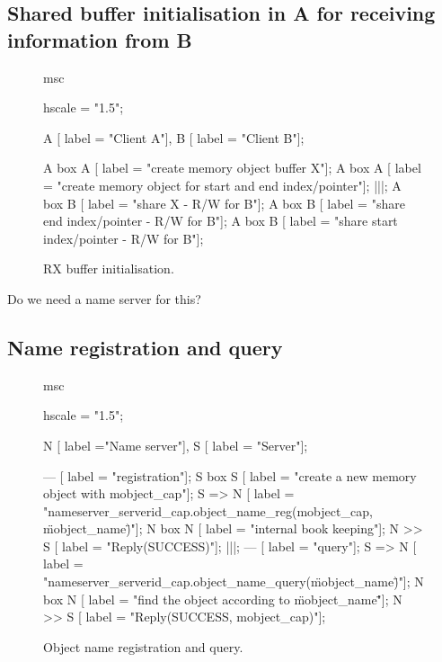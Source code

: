 \subsection{Shared buffer initialisation in A for receiving information from B}

\begin{figure}[htb]
\begin{center}
\begin{msc}
msc {
    hscale = "1.5";

    A [ label = "Client A"],
    B [ label = "Client B"];
    
    A box A [ label = "create memory object buffer X"];
    A box A [ label = "create memory object for start and end index/pointer"];
    |||;
    A box B [ label = "share X - R/W for B"];
    A box B [ label = "share end index/pointer - R/W for B"];
    A box B [ label = "share start index/pointer - R/W for B"];
}
\end{msc}
\end{center}
\caption{RX buffer initialisation.}
\end{figure}

\clearpage

Do we need a name server for this?

\subsection{Name registration and query}

\begin{figure}[htb]
\begin{center}
\begin{msc}
msc {
    hscale = "1.5";

    N [ label ="Name server"],
    S [ label = "Server"];
    
    --- [ label = "registration"];
    S box S [ label = "create a new memory object with mobject\_cap"];
    S => N [ label = "nameserver\_serverid\_cap.object\_name\_reg(mobject\_cap, \"mobject\_name\")"];
    N box N [ label = "internal book keeping"];
    N >> S [ label = "Reply(SUCCESS)"];
    |||;
    --- [ label = "query"];
    S => N [ label = "nameserver\_serverid\_cap.object\_name\_query(\"mobject\_name\")"];
    N box N [ label = "find the object according to \"mobject\_name\""];
    N >> S [ label = "Reply(SUCCESS, mobject\_cap)"];
}
\end{msc}
\end{center}
\caption{Object name registration and query.}
\end{figure}

